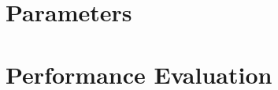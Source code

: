 \documentclass[USenglish,oneside,twocolumn]{article}
\begin{document}
\section{Parameters}
\label{app:Parameters}

\section{Performance Evaluation}
\label{sec:performancecompare}


\end{document}

